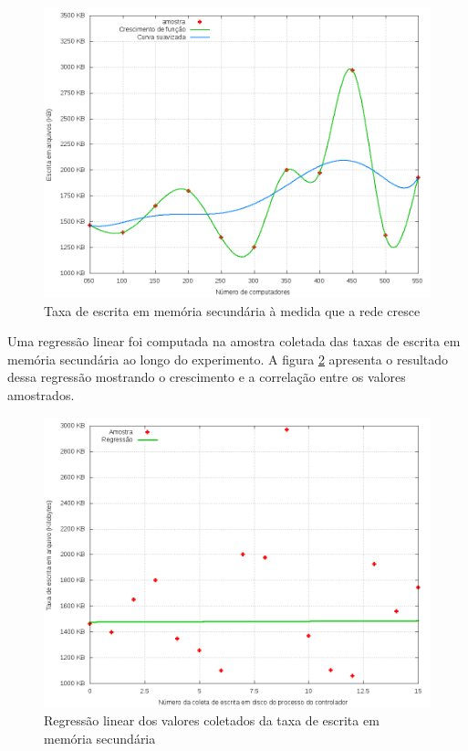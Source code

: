 \begin{figure}[!htb]
    \centering
    \label{fig:writing-rate-growth}
    \includegraphics[width=\linewidth]{img/writing-rate-growth}
    \caption{Taxa de escrita em memória secundária à medida que a rede cresce}
\end{figure}

Uma regressão linear foi computada na amostra coletada das taxas de escrita
em memória secundária ao longo do experimento.
A figura \ref{fig:scatter-writing-rate} apresenta o resultado dessa regressão
mostrando o crescimento e a correlação entre os valores amostrados.

\begin{figure}[!htb]
    \centering
    \label{fig:scatter-writing-rate}
    \includegraphics[width=\linewidth]{img/scatter-writing-rate}
    \caption{Regressão linear dos valores coletados da taxa de escrita em 
    memória secundária}
\end{figure}
